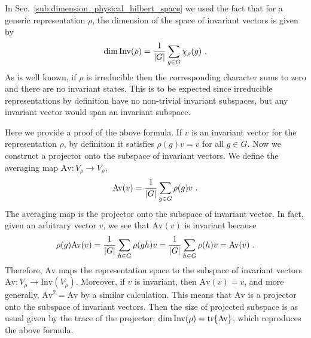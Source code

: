 In Sec.~\ref{sub:dimension_physical_hilbert_space} we used the fact that for a generic representation $\rho$, the dimension of the space of invariant vectors is given by
\begin{equation}
    \dim{\mathrm{Inv}(\rho)} = \frac{1}{\abs{G}} \sum_{g \in G} \chi_\rho(g) \ ,
\end{equation}
As is well known, if $\rho$ is irreducible then the corresponding character sums to zero and there are no invariant states.
This is to be expected since irreducible representations by definition have no non-trivial invariant subspaces, but any invariant vector would span an invariant subspace.

Here we provide a proof of the above formula.
If $v$ is an invariant vector for the representation $\rho$, by definition it satisfies $\rho(g) v = v$ for all $g \in G$.
Now we construct a projector onto the subspace of invariant vectors.
We define the averaging map $\mathrm{Av}: V_\rho \to V_\rho$,
\begin{equation}
    \mathrm{Av}(v) = \frac{1}{\abs{G}} \sum_{g \in G} \rho(g) v \ .
\end{equation}
The averaging map is the projector onto the subspace of invariant vector.
In fact, given an arbitrary vector $v$, we see that $\mathrm{Av}(v)$ is invariant because
\begin{equation}
    \rho(g) \mathrm{Av}(v) = \frac{1}{\abs{G}} \sum_{h \in G} \rho(g h) v = \frac{1}{\abs{G}} \sum_{h \in G} \rho(h) v = \mathrm{Av}(v) \ .
\end{equation}
Therefore, $\mathrm{Av}$ maps the representation space to the subspace of invariant vectors $\mathrm{Av}: V_\rho \to \mathrm{Inv}(V_\rho)$.
Moreover, if $v$ is invariant, then $\mathrm{Av}(v) = v$, and more generally, $\mathrm{Av}^2 = \mathrm{Av}$ by a similar calculation.
This means that $\mathrm{Av}$ is a projector onto the subspace of invariant vectors.
Then the size of projected subspace is as usual given by the trace of the projector, $\dim{\mathrm{Inv}(\rho)} = \tr{\mathrm{Av}}$, which reproduces the above formula.


